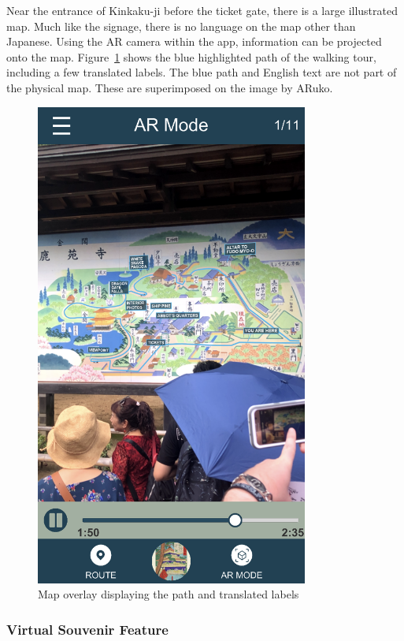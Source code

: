 \documentclass[a4paper, 10pt, american, titlepage]{article}
\begin{document}
Near the entrance of Kinkaku-ji before the ticket gate, there is a large
illustrated map. Much like the signage, there is no language on the map other
than Japanese. Using the AR camera within the app, information can be projected
onto the map. Figure~\ref{fig:arMapFeature} shows the blue highlighted path of
the walking tour, including a few translated labels. The blue path and English
text are not part of the physical map. These are superimposed on the image by
ARuko.

\begin{figure}[p]
	\centering
    \includegraphics[width=0.8\textwidth]{ar-map-feature.png}
    \caption{Map overlay displaying the path and translated labels}
    \label{fig:arMapFeature}
\end{figure}

\subsubsection{Virtual Souvenir Feature}
\label{sec:virtualSouveneir}
\end{document}
